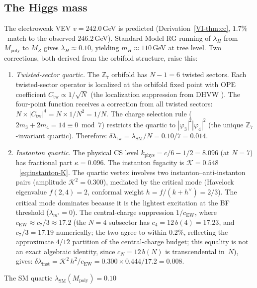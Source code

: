 \subsection{The Higgs mass}
\label{sec:higgs}
The electroweak VEV $v = 242.0$\,GeV is predicted
(Derivation~\ref*{VI-thm:cc}, $1.7\%$~match to the
observed $246.2$\,GeV).
Standard Model RG running of $\lambda_H$ from $M_{\mathrm{poly}}$
to $M_Z$ gives $\lambda_H \approx 0.10$,
yielding $m_H \approx 110$\,GeV at tree level.
Two corrections, both derived from the orbifold structure, raise this:
\begin{enumerate}
\item \emph{Twisted-sector quartic.}
  The $\mathbb{Z}_7$ orbifold has $N - 1 = 6$ twisted sectors.
  Each twisted-sector operator is localized at the orbifold fixed point
  with OPE coefficient $C_{\mathrm{tw}} \propto 1/\sqrt{N}$
  (the localization suppression from DHVW
  \citep{DixonHarveyVafaWitten1985}).
  The four-point function receives a correction from all twisted
  sectors:
  $N \times |C_{\mathrm{tw}}|^4 = N \times 1/N^2 = 1/N$.
  The charge selection rule ($2m_3 + 2m_4 = 14 \equiv 0 \bmod 7$)
  restricts the quartic to $|\varphi_3|^2|\varphi_4|^2$
  (the unique $\mathbb{Z}_7$-invariant quartic).
  Therefore:
  $\delta\lambda_{\mathrm{tw}} = \lambda_{\mathrm{SM}}/N
  = 0.10/7 = 0.014$.
\item \emph{Instanton quartic.}
  The physical CS level
  $k_{\mathrm{phys}} = c/6 - 1/2 = 8.096$ (at $N = 7$)
  has fractional part $\kappa = 0.096$.
  The instanton fugacity is
  $\mathcal{K} = 0.548$~\eqref{eq:instanton-K}.
  The quartic vertex involves two instanton--anti-instanton pairs
  (amplitude $\mathcal{K}^2 = 0.300$), mediated by the
  critical mode (Havelock eigenvalue $f(2,4) = 2$, conformal weight
  $h = f/(k{+}h^\vee) = 2/3$).
  The critical mode dominates because it is the lightest excitation
  at the BF threshold ($\lambda_{m^*} = 0$).
  The central-charge suppression $1/c_{\mathrm{EW}}$,
  where $c_{\mathrm{EW}} \approx c_7/3 \approx 17.2$
  (the $N = 4$ subsector has $c_4 = 12\,b(4) = 17.23$,
  and $c_7/3 = 17.19$ numerically; the two agree to within
  $0.2\%$, reflecting the approximate $4/12$ partition of
  the central-charge budget; this equality is not an exact
  algebraic identity, since $c_N = 12\,b(N)$ is
  transcendental in~$N$), gives:
  $\delta\lambda_{\mathrm{inst}} = \mathcal{K}^2\,h^2/c_{\mathrm{EW}}
  = 0.300 \times 0.444 / 17.2 = 0.008$.
\end{enumerate}
The SM quartic $\lambda_{\mathrm{SM}}(M_{\mathrm{poly}}) = 0.10$
